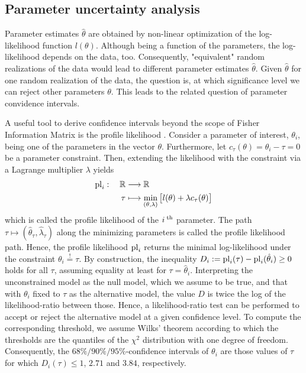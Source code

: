 \documentclass[article]{jss}
\begin{document}

\subsection{Parameter uncertainty analysis}

Parameter estimates $\hat \theta$  are obtained by non-linear optimization of the log-likelihood function $l(\theta)$. Although being a function of the parameters,  the log-likelihood depends on the data, too. Consequently, "equivalent" random realizations of the data would lead to different parameter estimates $\hat\theta$. Given $\hat\theta$ for one random realization of the data, the question is, at which significance level we can reject other parameters $\theta$. This leads to the related question of parameter convidence intervals.

A useful tool to derive confidence intervals beyond the scope of Fisher Information Matrix is the profile likelihood \citep{venzon1988method, murphy2000profile}. Consider a parameter of interest, $\theta_i$, being one of the parameters in the vector $\theta$. Furthermore, let $c_{\tau}(\theta) = \theta_i - \tau = 0$ be a parameter constraint.
Then, extending the likelihood with the constraint via a Lagrange multiplier $\lambda$ yields
\begin{align}
	\begin{aligned}
		{\rm pl}_i:\quad \mathbb R & \longrightarrow \mathbb R\\
		\tau & \longmapsto \min_{(\theta, \lambda)} \big[ l(\theta) + \lambda c_{\tau}(\theta) \big]
	\end{aligned}
	\label{eq:pl}
\end{align}
which is called the profile likelihood of the $i^{\;\rm th}$ parameter. The path $\tau \mapsto (\hat\theta_{\tau}, \hat\lambda_{\tau})$ along the minimizing parameters is called the profile likelihood path. Hence, the profile likelihood ${\rm pl}_i$ returns the minimal log-likelihood under the constraint $\theta_i \stackrel{!}{=} \tau$. By construction, the inequality $D_i := {\rm pl}_i(\tau) - {\rm pl}_i(\hat \theta_i) \geq 0$ holds for all $\tau$, assuming equality at least for $\tau = \hat\theta_i$. Interpreting the unconstrained model as the null model, which we assume to be true, and that with $\theta_i$ fixed to $\tau$ as the alternative model, the value $D$ is twice the log of the likelihood-ratio between those. Hence, a likelihood-ratio test can be performed to accept or reject the alternative model at a given confidence level. To compute the corresponding threshold, we assume Wilks' theorem according to which the thresholds are the quantiles of the $\chi^2$ distribution with one degree of freedom. Consequently, the $68\%/90\%/95\%$-confidence intervals of $\theta_i$ are those values of $\tau$ for which $D_i(\tau) \leq 1$, $2.71$ and $3.84$, respectively.
\end{document}
